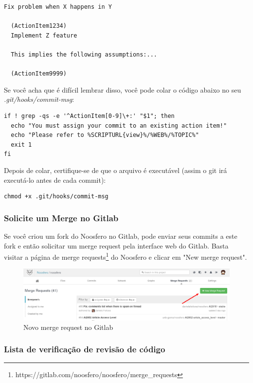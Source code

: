 \documentclass[11pt]{article}
\begin{document}
\begin{Verbatim}[frame=single,fontfamily=courier]
  Fix problem when X happens in Y
  
  (ActionItem1234)
  Implement Z feature

  This implies the following assumptions:...

  (ActionItem9999)
\end{Verbatim}

Se você acha que é difícil lembrar disso, você pode colar o código abaixo no
seu {\it .git/hooks/commit-msg}:

\begin{Verbatim}[frame=single,fontfamily=courier]
if ! grep -qs -e '^ActionItem[0-9]\+:' "$1"; then
  echo "You must assign your commit to an existing action item!"
  echo "Please refer to %SCRIPTURL{view}%/%WEB%/%TOPIC%"
  exit 1
fi
\end{Verbatim}

Depois de colar, certifique-se de que o arquivo é executável (assim o git irá
executá-lo antes de cada commit):

\begin{Verbatim}[frame=single,fontfamily=courier]
chmod +x .git/hooks/commit-msg
\end{Verbatim}

\subsubsection{Solicite um Merge no Gitlab}

Se você criou um fork do Noosfero no Gitlab, pode enviar seus commits a este
fork e então solicitar um merge request pela interface
web do Gitlab. Basta visitar a página de merge
requests\footnote{https://gitlab.com/noosfero/noosfero/merge\_requests} do
Noosfero e clicar em "New merge request".

\begin{figure}[h]
\center
\includegraphics[scale=0.4]{gitlab-new-merge-request.png}
\caption{Novo merge request no Gitlab}
\label{fig:gitlab-new-merge-request}
\end{figure}

\subsubsection{Lista de verificação de revisão de código}
\end{document}

